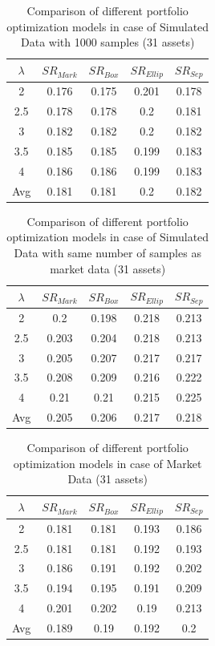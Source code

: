 \documentclass[12pt]{article}
\numberwithin{equation}{section}
\begin{document}
\begin{table}[h]
\centering
\captionsetup{justification=centering}
\begin{tabular}{||c|c|c|c|c||}
\hline
$\lambda$ & $SR_{Mark}$ & $SR_{Box}$ & $SR_{Ellip}$ & $SR_{Sep}$ \\
\hline
2 & 0.176 & 0.175 & 0.201 & 0.178 \\
2.5 & 0.178 & 0.178 & 0.2 & 0.181 \\
3 & 0.182 & 0.182 & 0.2 & 0.182 \\
3.5 & 0.185 & 0.185 & 0.199 & 0.183 \\
4 & 0.186 & 0.186 & 0.199 & 0.183 \\
\hline
Avg & 0.181 & 0.181 & 0.2 & 0.182 \\
\hline
\end{tabular}
\caption{Comparison of different portfolio optimization models in case of Simulated Data with 1000 samples (31 assets)}
\label{tab:1}
\end{table}

\begin{table}[h]
\centering
\captionsetup{justification=centering}
\begin{tabular}{||c|c|c|c|c||}
\hline
$\lambda$ & $SR_{Mark}$ & $SR_{Box}$ & $SR_{Ellip}$ & $SR_{Sep}$ \\
\hline
2 & 0.2 & 0.198 & 0.218 & 0.213 \\
2.5 & 0.203 & 0.204 & 0.218 & 0.213 \\
3 & 0.205 & 0.207 & 0.217 & 0.217 \\
3.5 & 0.208 & 0.209 & 0.216 & 0.222 \\
4 & 0.21 & 0.21 & 0.215 & 0.225 \\
\hline
Avg & 0.205 & 0.206 & 0.217 & 0.218 \\
\hline
\end{tabular}
\caption{Comparison of different portfolio optimization models in case of Simulated Data with same number of samples as market data (31 assets)}
\label{tab:2}
\end{table}

\begin{table}[h]
\centering
\captionsetup{justification=centering}
\begin{tabular}{||c|c|c|c|c||}
\hline
$\lambda$ & $SR_{Mark}$ & $SR_{Box}$ & $SR_{Ellip}$ & $SR_{Sep}$ \\
\hline
2 & 0.181 & 0.181 & 0.193 & 0.186 \\
2.5 & 0.181 & 0.181 & 0.192 & 0.193 \\
3 & 0.186 & 0.191 & 0.192 & 0.202 \\
3.5 & 0.194 & 0.195 & 0.191 & 0.209 \\
4 & 0.201 & 0.202 & 0.19 & 0.213 \\
\hline
Avg & 0.189 & 0.19 & 0.192 & 0.2 \\
\hline
\end{tabular}
\caption{Comparison of different portfolio optimization models in case of Market Data (31 assets)}
\label{tab:3}
\end{table}
\end{document}
